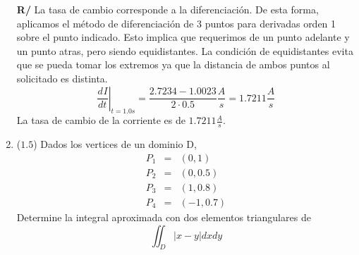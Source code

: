 \documentclass[12pt]{article}
\newcommand{\diff}[3]{\frac{d^{#3} #1}{d#2^{#3}}}
\begin{document}
\begin{enumerate}[leftmargin=*,widest=9]
\textbf{R/} La tasa de cambio corresponde a la diferenciación. De esta forma, aplicamos el método de diferenciación de 3 puntos para derivadas orden 1 sobre el punto indicado. Esto implica que requerimos de un punto adelante y un punto atras, pero siendo equidistantes. La condición de equidistantes evita que se pueda tomar los extremos ya que la distancia de ambos puntos al solicitado es distinta.
\[
\left.\diff{I}{t}{}\right|_{t=1.0s} = \frac{2.7234-1.0023}{2\cdot 0.5} \frac{A}{s} = 1.7211 \frac{A}{s}
\]
La tasa de cambio de la corriente es de \(1.7211 \frac{A}{s}\).
   \item (\(1.5\)) Dados los vertices de un dominio D,
   	\begin{eqnarray*}
   	P_1 &=& (0 , 1) \\ P_2 &=& (0 , 0.5) \\ P_3 &=& (1 , 0.8) \\ P_4 &=& (-1 , 0.7)
   	\end{eqnarray*}
Determine la integral aproximada con dos elementos triangulares de $$\iint _{D} |x-y| dx dy$$


\end{enumerate}
\end{document}
